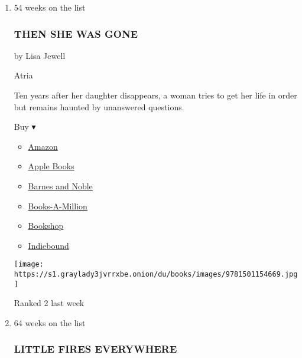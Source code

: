 \begin{enumerate}
\def\labelenumi{\arabic{enumi}.}
\item
  54 weeks on the list

  \hypertarget{then-she-was-gone}{%
  \subsubsection{THEN SHE WAS GONE}\label{then-she-was-gone}}

  by Lisa Jewell

  Atria

  Ten years after her daughter disappears, a woman tries to get her life
  in order but remains haunted by unanswered questions.

  Buy ▾

  \begin{itemize}
  \tightlist
  \item
    \href{https://www.amazon.com/Then-She-Was-Gone-Novel-ebook/dp/B074MDD3H6?tag=NYTBS-20}{Amazon}
  \item
    \href{https://du-gae-books-dot-nyt-du-prd.appspot.com/buy?title=THEN+SHE+WAS+GONE\&author=Lisa+Jewell}{Apple
    Books}
  \item
    \href{https://www.anrdoezrs.net/click-7990613-11819508?url=https\%3A\%2F\%2Fwww.barnesandnoble.com\%2Fw\%2F\%3Fean\%3D9781501154652}{Barnes
    and Noble}
  \item
    \href{https://www.anrdoezrs.net/click-7990613-35140?url=https\%3A\%2F\%2Fwww.booksamillion.com\%2Fp\%2FTHEN\%2BSHE\%2BWAS\%2BGONE\%2FLisa\%2BJewell\%2F9781501154652}{Books-A-Million}
  \item
    \href{https://bookshop.org/a/3546/9781501154652}{Bookshop}
  \item
    \href{https://www.indiebound.org/book/9781501154652?aff=NYT}{Indiebound}
  \end{itemize}

  \texttt{[image: https://s1.graylady3jvrrxbe.onion/du/books/images/9781501154669.jpg]}

  Ranked 2 last week
\item
  \href{https://www.nytimes3xbfgragh.onion/2017/09/25/books/review/little-fires-everywhere-celeste-ng.html}{}

  64 weeks on the list

  \hypertarget{little-fires-everywhere}{%
  \subsubsection{LITTLE FIRES
  EVERYWHERE}\label{little-fires-everywhere}}


\end{enumerate}
